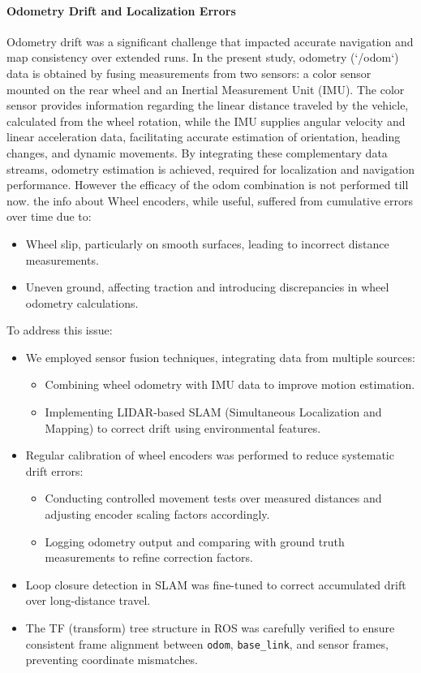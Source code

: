 \documentclass[english,project]{buwthesis}
\begin{document}
\paragraph{Odometry Drift and Localization Errors}
Odometry drift was a significant challenge that impacted accurate navigation and map consistency over extended runs. In the present study, odometry (`/odom`) data is obtained by fusing measurements from two sensors: a color sensor mounted on the rear wheel and an Inertial Measurement Unit (IMU). The color sensor provides information regarding the linear distance traveled by the vehicle, calculated from the wheel rotation, while the IMU supplies angular velocity and linear acceleration data, facilitating accurate estimation of orientation, heading changes, and dynamic movements. By integrating these complementary data streams, odometry estimation is achieved, required for  localization and navigation performance. However the efficacy of the odom combination is not performed till now. the info about Wheel encoders, while useful, suffered from cumulative errors over time due to:
\begin{itemize}
\item Wheel slip, particularly on smooth surfaces, leading to incorrect distance measurements.
\item Uneven ground, affecting traction and introducing discrepancies in wheel odometry calculations.
\end{itemize}

To address this issue:
\begin{itemize}
\item We employed sensor fusion techniques, integrating data from multiple sources:
  \begin{itemize}
    \item Combining wheel odometry with IMU data to improve motion estimation.
    \item Implementing LIDAR-based SLAM (Simultaneous Localization and Mapping) to correct drift using environmental features.
  \end{itemize}
\item Regular calibration of wheel encoders was performed to reduce systematic drift errors:
  \begin{itemize}
    \item Conducting controlled movement tests over measured distances and adjusting encoder scaling factors accordingly.
    \item Logging odometry output and comparing with ground truth measurements to refine correction factors.
  \end{itemize}
\item Loop closure detection in SLAM was fine-tuned to correct accumulated drift over long-distance travel.
\item The TF (transform) tree structure in ROS was carefully verified to ensure consistent frame alignment between \texttt{odom}, \texttt{base\_link}, and sensor frames, preventing coordinate mismatches.
\end{itemize}
\end{document}
